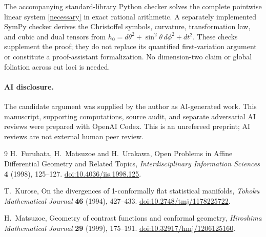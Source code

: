 \documentclass[11pt]{article}
\begin{document}
The accompanying standard-library Python checker solves the complete
pointwise linear system \eqref{necessary} in exact rational arithmetic.
A separately implemented SymPy checker derives the Christoffel symbols,
curvature, transformation law, and cubic and dual tensors from
$h_0=d\theta^2+\sin^2\theta\,d\phi^2+dt^2$. These checks supplement
the proof; they do not replace its quantified first-variation argument
or constitute a proof-assistant formalization. No dimension-two claim
or global foliation across cut loci is needed.

\paragraph{AI disclosure.}
The candidate argument was supplied by the author as AI-generated work.
This manuscript, supporting computations, source audit, and separate
adversarial AI reviews were prepared with OpenAI Codex. This is an
unrefereed preprint; AI reviews are not external human peer review.

\begin{thebibliography}{9}
H.~Furuhata, H.~Matsuzoe and H.~Urakawa,
Open Problems in Affine Differential Geometry and Related Topics,
\emph{Interdisciplinary Information Sciences} \textbf{4} (1998), 125--127.
\href{https://doi.org/10.4036/iis.1998.125}{doi:10.4036/iis.1998.125}.

T.~Kurose, On the divergences of 1-conformally flat statistical manifolds,
\emph{Tohoku Mathematical Journal} \textbf{46} (1994), 427--433.
\href{https://doi.org/10.2748/tmj/1178225722}{doi:10.2748/tmj/1178225722}.

H.~Matsuzoe, Geometry of contrast functions and conformal geometry,
\emph{Hiroshima Mathematical Journal} \textbf{29} (1999), 175--191.
\href{https://doi.org/10.32917/hmj/1206125160}{doi:10.32917/hmj/1206125160}.
\end{thebibliography}
\end{document}
